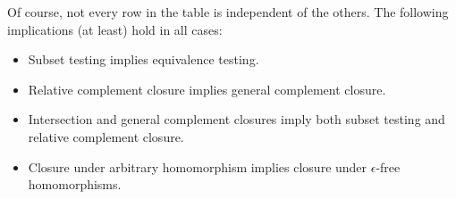 Of course, not every row in the table is independent of the others.  The
following implications (at least) hold in all cases:
\begin{itemize}
	\item Subset testing implies equivalence testing.
	\item Relative complement closure implies general complement closure.
	\item Intersection and general complement closures imply both subset testing
          and relative complement closure.
	\item Closure under arbitrary homomorphism implies closure under
          $\epsilon$-free homomorphisms.
\end{itemize}
